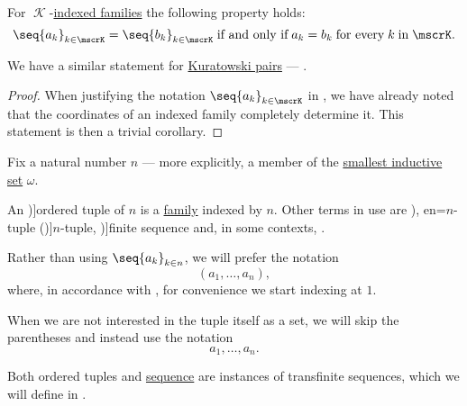 \begin{proposition}\label{thm:indexed_family_extensionality}
  For \( \mscrK \)-\hyperref[def:indexed_family]{indexed families} the following property holds:
  \begin{equation}\label{eq:thm:indexed_family_extensionality}
    \seq{ a_k }_{k \in \mscrK} = \seq{ b_k }_{k \in \mscrK} \T{if and only if} a_k = b_k \T{for every} k \T{in} \mscrK.
  \end{equation}
\end{proposition}
\begin{comments}
  \item We have a similar statement for \hyperref[def:kuratowski_pair]{Kuratowski pairs} --- .
\end{comments}
\begin{proof}
  When justifying the notation \( \seq{ a_k }_{k \in \mscrK} \) in , we have already noted that the coordinates of an indexed family completely determine it. This statement is then a trivial corollary.
\end{proof}

\begin{definition}\label{def:ordered_tuple}
  Fix a natural number \( n \) --- more explicitly, a member of the \hyperref[thm:smallest_inductive_set_existence]{smallest inductive set} \( \omega \).

  An \term[ru=кортеж (\cite[def. 1.2]{БелоусовТкачёв2004ДискретнаяМатематика})]{ordered tuple} of  \( n \) is a \hyperref[def:indexed_family]{family} indexed by \( n \). Other terms in use are \term[ru=упорядоченная \( n \)-ка (\cite[9]{Архангельский1988Множества}), en=\( n \)-tuple (\cite[51]{Enderton1977Sets})]{\( n \)-tuple}, \term[en=finite sequence (\cite[9]{Halmos1960Sets})]{finite sequence} and, in some contexts, .

  Rather than using \( \seq{ a_k }_{k \in n} \), we will prefer the notation
  \begin{equation*}
    (a_1, \ldots, a_n),
  \end{equation*}
  where, in accordance with , for convenience we start indexing at \( 1 \).

  When we are not interested in the tuple itself as a set, we will skip the parentheses and instead use the notation
  \begin{equation*}
    a_1, \ldots, a_n.
  \end{equation*}
\end{definition}
\begin{comments}
  \item Both ordered tuples and \hyperref[def:sequence]{sequence} are instances of transfinite sequences, which we will define in .
\end{comments}

